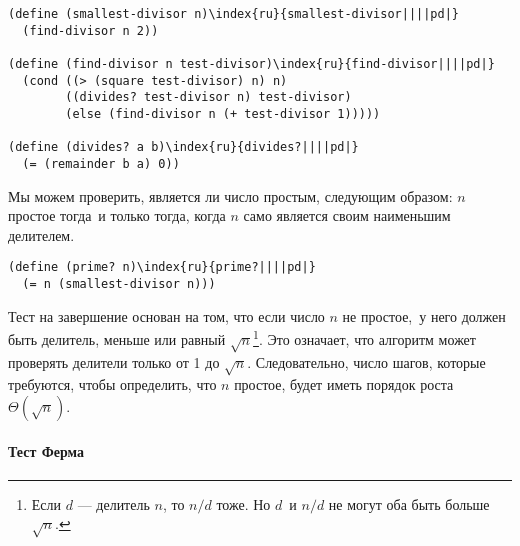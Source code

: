 \begin{Verbatim}[fontsize=\small]
(define (smallest-divisor n)\index{ru}{smallest-divisor||||pd|}
  (find-divisor n 2))

(define (find-divisor n test-divisor)\index{ru}{find-divisor||||pd|}
  (cond ((> (square test-divisor) n) n)
        ((divides? test-divisor n) test-divisor)
        (else (find-divisor n (+ test-divisor 1)))))

(define (divides? a b)\index{ru}{divides?||||pd|}
  (= (remainder b a) 0))
\end{Verbatim}

Мы можем проверить, является ли число простым, следующим
образом: $n$ простое тогда~и только тогда, когда
$n$ само является своим наименьшим \mbox{делителем}.

\begin{Verbatim}[fontsize=\small]
(define (prime? n)\index{ru}{prime?||||pd|}
  (= n (smallest-divisor n)))
\end{Verbatim}

Тест на завершение основан на том, что если число
$n$ не простое,~у него должен быть делитель, меньше или
равный $\sqrt{n}$\footnote{Если $d$ --- делитель $n$, то
$n / d$ тоже. Но $d$~и $n /
d$ не могут оба быть больше $\sqrt{n}$.
}.
Это означает, что алгоритм может проверять делители только от 1 до
$\sqrt{n}$.  Следовательно, число шагов, которые требуются,
чтобы определить, что $n$ простое, будет иметь порядок
роста $\Theta(\sqrt{n})$.

\paragraph{Тест Ферма}



